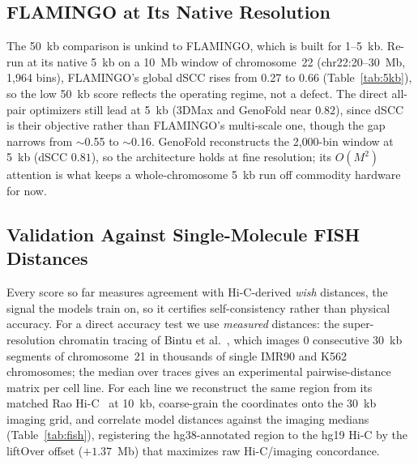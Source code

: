 \documentclass[conference]{IEEEtran}
\providecommand{\flamfiftyglobal}{0.27}
\providecommand{\flamfiveglobal}{0.66}
\providecommand{\fishnseg}{0}
\begin{document}
\subsection{FLAMINGO at Its Native Resolution}
The 50~kb comparison is unkind to FLAMINGO, which is built for 1--5~kb. Re-run at its
native 5~kb on a 10~Mb window of chromosome~22 (chr22:20--30~Mb, 1{,}964 bins),
FLAMINGO's global dSCC rises from \flamfiftyglobal{} to \flamfiveglobal{}
(Table~\ref{tab:5kb}), so the low 50~kb score reflects the operating regime, not a defect.
The direct all-pair optimizers still lead at 5~kb (3DMax and GenoFold near $0.82$), since
dSCC is their objective rather than FLAMINGO's multi-scale one, though the gap narrows
from $\sim$0.55 to $\sim$0.16. GenoFold reconstructs the 2{,}000-bin window at 5~kb (dSCC
$0.81$), so the architecture holds at fine resolution; its $O(M^2)$ attention is what
keeps a whole-chromosome 5~kb run off commodity hardware for now.

\begin{table}[t]
\caption{Native-resolution comparison at 5~kb on a 10~Mb window of GM12878
chromosome~22 (chr22:20--30~Mb, 1{,}964 bins), scored by dSCC over the same bins.
Best global mean in bold. $^{\ast}$: FLAMINGO from its published R package
(mean\,$\pm$\,std over 3 seeds); other methods are single representative runs.
At native resolution FLAMINGO's global dSCC rises from \flamfiftyglobal{} (50~kb,
Table~\ref{tab:benchmark}) to \flamfiveglobal{}.}
\label{tab:5kb}
\centering

\end{table}

\subsection{Validation Against Single-Molecule FISH Distances}
\label{sub:fish}
Every score so far measures agreement with Hi-C-derived \emph{wish} distances, the
signal the models train on, so it certifies self-consistency rather than physical accuracy.
For a direct accuracy test we use \emph{measured} distances: the super-resolution
chromatin tracing of Bintu et al.~\cite{bintu2018}, which images \fishnseg{} consecutive
30~kb segments of chromosome~21 in thousands of single IMR90 and K562 chromosomes; the
median over traces gives an experimental pairwise-distance matrix per cell line. For each
line we reconstruct the same region from its matched Rao Hi-C~\cite{rao2014} at 10~kb,
coarse-grain the coordinates onto the 30~kb imaging grid, and correlate model distances
against the imaging medians (Table~\ref{tab:fish}), registering the hg38-annotated region
to the hg19 Hi-C by the liftOver offset ($+1.37$~Mb) that maximizes raw Hi-C/imaging
concordance.
\end{document}
